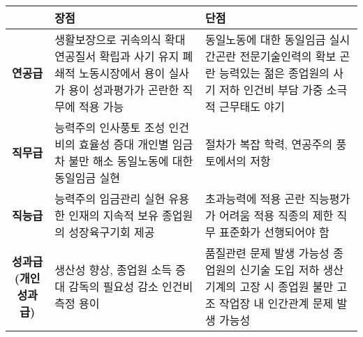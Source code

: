     \begin{tabular}{cp{7cm}p{7cm}}
        \toprule
        & \textbf{장점} & \textbf{단점} \\
        \midrule
        \textbf{연공급} 
        & 생활보장으로 귀속의식 확대 \newline 연공질서 확립과 사기 유지 \newline 폐쇄적 노동시장에서 용이 \newline 실사가 용이 \newline 성과평가가 곤란한 직무에 적용 가능 
        & 동일노동에 대한 동일임금 실시간곤란 \newline 전문기술인력의 확보 곤란 \newline 능력있는 젊은 종업원의 사기 저하 \newline 인건비 부담 가중 \newline 소극적 근무태도 야기 \\
        \midrule
        \textbf{직무급} 
        & 능력주의 인사풍토 조성 \newline 인건비의 효율성 증대 \newline 개인별 임금차 불만 해소 \newline 동일노동에 대한 동일임금 실현 
        & 절차가 복잡 \newline 학력, 연공주의 풍토에서의 저항 \\
        \midrule
        \textbf{직능급} 
        & 능력주의 임금관리 실현 \newline 유용한 인재의 지속적 보유 \newline 종업원의 성장육구기회 제공 
        & 초과능력에 적용 곤란 \newline 직능평가가 어려움 \newline 적용 직종의 제한 \newline 직무 표준화가 선행되어야 함 \\
        \midrule
        \textbf{성과급 (개인성과급)} 
        & 생산성 향상, 종업원 소득 증대 \newline 감독의 필요성 감소 \newline 인건비 측정 용이 
        & 품질관련 문제 발생 가능성 \newline 종업원의 신기술 도입 저하 \newline 생산기계의 고장 시 종업원 불만 고조 \newline 작업장 내 인간관계 문제 발생 가능성 \\
        \bottomrule
    \end{tabular}

